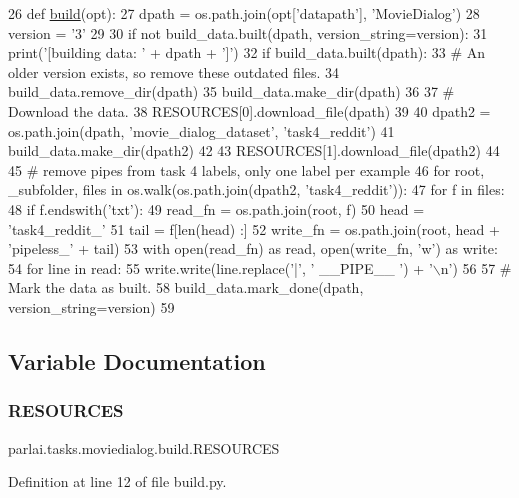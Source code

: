 \begin{DoxyCode}
26 \textcolor{keyword}{def }\hyperlink{namespacedialog__babi__feedback_1_1build_a7a9d289f7493a5ded13c4b7f071b6184}{build}(opt):
27     dpath = os.path.join(opt[\textcolor{stringliteral}{'datapath'}], \textcolor{stringliteral}{'MovieDialog'})
28     version = \textcolor{stringliteral}{'3'}
29 
30     \textcolor{keywordflow}{if} \textcolor{keywordflow}{not} build\_data.built(dpath, version\_string=version):
31         print(\textcolor{stringliteral}{'[building data: '} + dpath + \textcolor{stringliteral}{']'})
32         \textcolor{keywordflow}{if} build\_data.built(dpath):
33             \textcolor{comment}{# An older version exists, so remove these outdated files.}
34             build\_data.remove\_dir(dpath)
35         build\_data.make\_dir(dpath)
36 
37         \textcolor{comment}{# Download the data.}
38         RESOURCES[0].download\_file(dpath)
39 
40         dpath2 = os.path.join(dpath, \textcolor{stringliteral}{'movie\_dialog\_dataset'}, \textcolor{stringliteral}{'task4\_reddit'})
41         build\_data.make\_dir(dpath2)
42 
43         RESOURCES[1].download\_file(dpath2)
44 
45         \textcolor{comment}{# remove pipes from task 4 labels, only one label per example}
46         \textcolor{keywordflow}{for} root, \_subfolder, files \textcolor{keywordflow}{in} os.walk(os.path.join(dpath2, \textcolor{stringliteral}{'task4\_reddit'})):
47             \textcolor{keywordflow}{for} f \textcolor{keywordflow}{in} files:
48                 \textcolor{keywordflow}{if} f.endswith(\textcolor{stringliteral}{'txt'}):
49                     read\_fn = os.path.join(root, f)
50                     head = \textcolor{stringliteral}{'task4\_reddit\_'}
51                     tail = f[len(head) :]
52                     write\_fn = os.path.join(root, head + \textcolor{stringliteral}{'pipeless\_'} + tail)
53                     with open(read\_fn) \textcolor{keyword}{as} read, open(write\_fn, \textcolor{stringliteral}{'w'}) \textcolor{keyword}{as} write:
54                         \textcolor{keywordflow}{for} line \textcolor{keywordflow}{in} read:
55                             write.write(line.replace(\textcolor{stringliteral}{'|'}, \textcolor{stringliteral}{' \_\_PIPE\_\_ '}) + \textcolor{stringliteral}{'\(\backslash\)n'})
56 
57         \textcolor{comment}{# Mark the data as built.}
58         build\_data.mark\_done(dpath, version\_string=version)
59 \end{DoxyCode}


\subsection{Variable Documentation}
\mbox{\label{namespaceparlai_1_1tasks_1_1moviedialog_1_1build_a6a0958effc5a7e76d7f4506ba4044d0a}} 
\subsubsection{\texorpdfstring{R\+E\+S\+O\+U\+R\+C\+ES}{RESOURCES}}
{\footnotesize\ttfamily parlai.\+tasks.\+moviedialog.\+build.\+R\+E\+S\+O\+U\+R\+C\+ES}



Definition at line 12 of file build.\+py.

